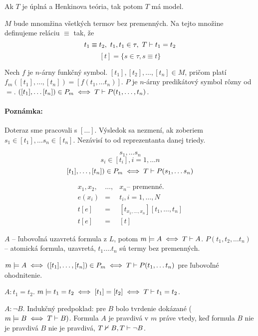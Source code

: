 \begin{lema}
    Ak $T$ je úplná a Henkinova teória, tak potom $T$ má model.
\end{lema}    
\begin{dokaz}
    $M$ bude mnomžina všetkých termov bez premenných. Na tejto
    množine definujeme reláciu $\equiv$ tak, že 
    $$ t_1 \equiv t_2,~t_1, t_1 \in \tau,~T \vdash t_1=t_2 $$
    $$[t]=\{ s\in \tau, s \equiv t \} $$

    Nech $f$ je $n$-árny funkčný symbol. $[t_1], [t_2], \ldots, [t_n] \in M$, pričom
    platí $f_m([t_1], \ldots, [t_n]) = [f(t_1, \ldots t_n)]$. $P$ je $n$-árny
    predikátový symbol rôzny od $=$. $([t_1], \ldots [t_n]) \in P_m \iff T \vdash
    P(t_1, \ldots, t_n)$.
\end{dokaz}

\paragraph{Poznámka:} Doteraz sme pracovali s $[\ldots]$. Výsledok sa nezmení,
ak zoberiem $s_1 \in [t_1], \ldots s_n \in [t_n]$. Nezávisí to od reprezentanta
danej triedy.
\par
$$ s_1, \ldots s_n $$
$$ s_i \in [t_i], i = 1, \ldots n $$
$$ [t_1], \ldots, [t_n]) \in P_m \iff T \vdash P(s_1, \dots s_n) $$

\par

\begin{eqnarray*}
    x_1, x_2, &\ldots,& x_n \mbox{-- premenné}.	\\
    e(x_i) &=& t_i, i=1,\ldots,N	\\
    t[e] &=& [t_{x_1,\ldots,x_n}][t_1,\ldots, t_n]	\\
    t[e] &=& [t]
\end{eqnarray*}

$A$ -- ľubovoľná uzavretá formula z $L$, potom $m \models A \iff T \vdash A$.
$P(t_1, t_2, \ldots t_n)$ -- atomická formula,  uzavretá, $t_1. \ldots t_n$ sú
termy bez premenných.

$m \models A \iff ([t_1], \ldots, [t_n]) \in P_m \iff T \vdash P(t_1,\ldots
t_n)$ pre ľubovoľné ohodnitenie.

\par $A: t_1 = t_2$. $m \models t_1 = t_2 \iff [t_1] = [t_2] \iff T \vdash t_1 =
t_2$.

\par $A: \neg B$. Indukčný predpoklad: pre $B$ bolo tvrdenie dokázané ($m\models
B \iff T \vdash B)$. Formula $A$ je pravdivá v $m$ práve vtedy, keď formula $B$
nie je pravdivá $B$ nie je pravdivá, $T \nvdash B, T \vdash \neg B$.

